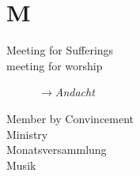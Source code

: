 \section*{M}

\articlesize

\begin{description}

 \item[Meeting for Sufferings]
 
 \item[meeting for worship]  $\to$\textit{Andacht}

 \item[Member by Convincement]
 
 \item[Ministry]
 
 \item[Monatsversammlung]
 
 \item[Musik]
 
 \end{description}

\normalsize
